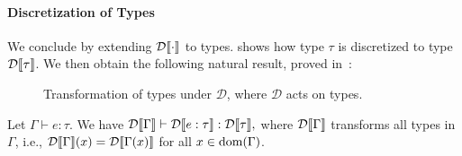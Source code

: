 \paragraph{Discretization of Types}
We conclude by extending $\mathcal{D}\llbracket \cdot \rrbracket$ to types.  shows how type $\tau$ is discretized to type $\mathcal{D}\llbracket \tau \rrbracket$. We then obtain the following natural result, proved in~\cite[\S~E.1]{Wu2026SliceExtended}:
%
\begin{figure}[t]
	\centering
	\caption{Transformation of types under $\mathcal{D}$, where $\mathcal{D}$ acts on types.}
	\label{fig:discretization-types}
\end{figure}
%
%
\begin{theorem}\label{lem:type-transformations}
	Let $\Gamma \vdash e : \tau$. We have
	$
	\mathcal{D}\llbracket \Gamma \rrbracket \vdash \mathcal{D}\llbracket e : \tau \rrbracket : \mathcal{D}\llbracket \tau \rrbracket,
	$
	where $\mathcal{D}\llbracket \Gamma \rrbracket$ transforms all types in $\Gamma$, i.e., $\mathcal{D}\llbracket \Gamma \rrbracket(x) = \mathcal{D}\llbracket \Gamma(x) \rrbracket$ for all $x \in \textnormal{dom}(\Gamma)$.
\end{theorem}
%
